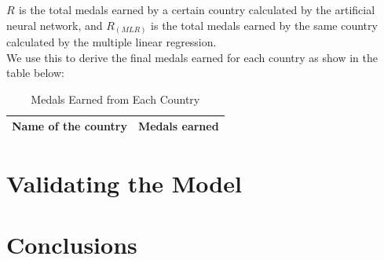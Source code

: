 \documentclass{mcmthesis}
\begin{document}
 $R_{}$ is the total medals earned by a certain country calculated by the artificial neural network, and $R_(MLR)$ is the total medals earned by the same country calculated by the multiple linear regression.\\
We use this to derive the final medals earned for each country as show in the table below:
\begin{table}[H]
\centering 
\label{c}
\caption{Medals Earned from Each Country}
\vspace{5pt}
\begin{tabularx}{\textwidth} {
  >{\raggedright\arraybackslash}X 
  >{\raggedright\arraybackslash}X  }
 \hline
\textbf{Name of the country} & \textbf{Medals earned} \\
\hline\hline
\end{tabularx}
\end{table}






\section{Validating the Model}


\section{Conclusions}
\end{document}
